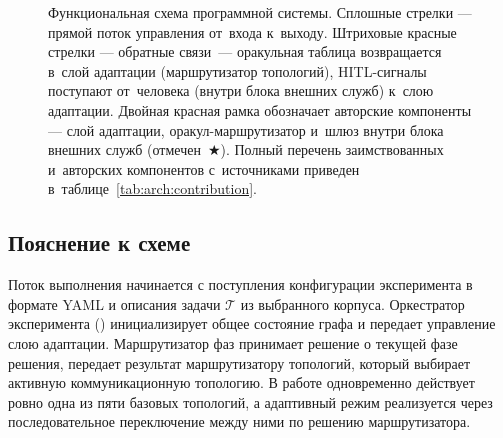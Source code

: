 \begin{figure}[!htbp]

\caption{Функциональная схема программной системы. Сплошные стрелки ---
прямой поток управления от~входа к~выходу. Штриховые красные стрелки ---
обратные связи~--- оракульная таблица возвращается в~слой адаптации
(маршрутизатор топологий), HITL-сигналы поступают от~человека
(внутри блока внешних служб) к~слою адаптации. Двойная красная рамка
обозначает авторские компоненты --- слой адаптации, оракул-маршрутизатор
и~шлюз  внутри блока внешних служб (отмечен~$\bigstar$).
Полный перечень заимствованных и~авторских компонентов с~источниками
приведен в~таблице~\ref{tab:arch:contribution}.}
\label{fig:appA:scheme}
\end{figure}

\subsection*{Пояснение к схеме}

Поток выполнения начинается с поступления конфигурации эксперимента
в формате YAML и описания задачи $\mathcal{T}$ из выбранного
корпуса. Оркестратор эксперимента ()
инициализирует общее состояние графа и передает управление слою
адаптации. Маршрутизатор фаз принимает решение о текущей фазе
решения, передает результат маршрутизатору топологий, который
выбирает активную коммуникационную топологию. В работе одновременно
действует ровно одна из пяти базовых топологий, а адаптивный режим
реализуется через последовательное переключение между ними по
решению маршрутизатора.

